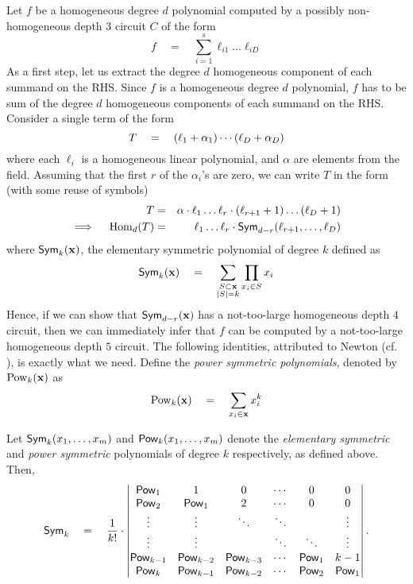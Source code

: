 Let $f$ be a homogeneous degree $d$ polynomial computed by a possibly
non-homogeneous depth $3$ circuit $C$ of the form
\[
f\quad=\quad \sum_{i=1}^s \ell_{i1}\dots \ell_{iD}
\]
As a first step, let us extract the degree $d$ homogeneous component
of each summand on the RHS.
Since $f$ is a homogeneous degree $d$ polynomial, $f$ has to be sum of
the degree $d$ homogeneous components of each summand on the RHS.
Consider a single term of the form
\[
T \quad = \quad (\ell_1 + \alpha_1)\cdots (\ell_D + \alpha_D)
\]
where each $\ell_i$ is a homogeneous linear polynomial, and $\alpha$
are elements from the field.
Assuming that the first $r$ of the $\alpha_i$'s are zero, we can write
$T$ in the form (with some reuse of symbols)
\begin{eqnarray*}
T & = &  \alpha \cdot \ell_1\dots \ell_r \cdot (\ell_{r+1} + 1)\dots (\ell_D+1)\\
\implies \quad \mathrm{Hom}_d(T) & = & \ell_1 \dots \ell_r \cdot \mathsf{Sym}_{d-r}(\ell_{r+1}, \dots, \ell_D)
\end{eqnarray*}
where $\mathsf{Sym}_{k}(\mathbf{x})$, the elementary symmetric polynomial of
degree $k$ defined as
\[
\mathsf{Sym}_k(\mathbf{x}) \quad = \quad \sum_{\substack{S\subset \mathbf{x}\\|S| = k}} \prod_{x_i\in S}x_i
\]
Hence, if we can show that $\mathsf{Sym}_{d-r}(\mathbf{x})$ has a not-too-large
homogeneous depth $4$ circuit, then we can immediately infer that $f$
can be computed by a not-too-large homogeneous depth $5$ circuit.
The following identities, attributed to Newton (cf. \cite{kalman00}),
is exactly what we need.
Define the \emph{power symmetric polynomials}, denoted by
$\mathrm{Pow}_k(\mathbf{x})$ as
\[
\mathrm{Pow}_k(\mathbf{x}) \quad = \quad \sum_{x_i \in \mathbf{x}} x_i^k
\]

\begin{lemma}\label{lem:newton-identities}
  Let $\mathsf{Sym}_k(x_1,\ldots,x_m)$ and $\mathsf{Pow}_k(x_1,\ldots,x_m)$ denote
  the \emph{elementary symmetric} and \emph{power symmetric} polynomials of degree
  $k$ respectively, as defined above. 
Then,
  $$
  \mathsf{Sym}_k\quad = \quad\frac{1}{k!} \cdot 
  \begin{vmatrix}\mathsf{Pow}_1 & 1 & 0 & \cdots & 0 & 0\\ 
    \mathsf{Pow}_2 & \mathsf{Pow}_1 & 2 & \cdots & 0 & 0 \\ 
    \vdots& \vdots & \ddots & \ddots &  & \vdots \\
    \vdots& \vdots &  & \ddots & \ddots & \vdots \\
    \mathsf{Pow}_{k-1} & \mathsf{Pow}_{k-2} & \mathsf{Pow}_{k-3}& \cdots & \mathsf{Pow}_1 & k-1 \\ 
    \mathsf{Pow}_k & \mathsf{Pow}_{k-1} & \mathsf{Pow}_{k-2} & \cdots & \mathsf{Pow}_2 & \mathsf{Pow}_1 
  \end{vmatrix}.
  $$
\end{lemma}

